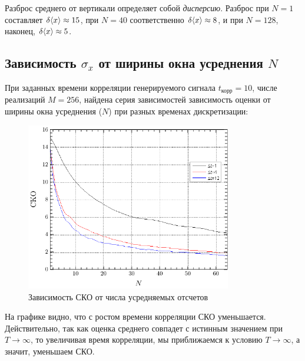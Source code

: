 \documentclass[a4paper,14pt]{extarticle}
\begin{document}
Разброс среднего от вертикали определяет собой \textit{дисперсию}. Разброс при $N=1$ составляет $\delta \langle x\rangle\approx15$, при $N=40$ соответственно $\delta \langle x\rangle\approx8$, и при $N=128$, наконец, $\delta \langle x\rangle\approx5$.





\subsection{Зависимость $\sigma_x$ от ширины окна усреднения $N$}
При заданных времени корреляции генерируемого сигнала $t_\text{корр}=10$, числе реализаций $M=256$, найдена серия зависимостей зависимость оценки от ширины окна усреднения ($N$) при разных временах дискретизации:
\begin{figure}[H]
    \centering
    \includegraphics[width=0.8\textwidth]{fig/sko_t10.pdf}
    \caption{Зависимость СКО от числа усредняемых отсчетов}
    \label{fig:sko_from_n_t10}
\end{figure}
На графике видно, что с ростом времени корреляции СКО уменьшается. Действительно, так как оценка среднего совпадет\footnotemark{} с истинным значением при $T \to \infty$, то увеличивая время корреляции, мы приближаемся к условию $T \to \infty$, а значит, уменьшаем СКО.
\end{document}
